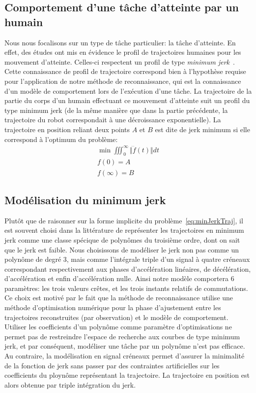 \subsection{Comportement d'une t\^ache d'atteinte par un humain}
Nous nous focalisons sur  un type de t\^ache particulier:
la t\^ache d'atteinte.
En effet, des études ont mis en évidence le profil  
de trajectoires humaines pour les mouvement d'atteinte.
Celles-ci respectent un profil de type \emph{minimum jerk}~\cite{flash85}.
\label{subsection:modelJerk}
Cette connaissance de profil de trajectoire correspond
bien à l'hypothèse requise pour l'application de notre méthode 
de reconnaissance, qui est la connaissance d'un modèle de comportement
lors de l'exécution d'une t\^ache.
La trajectoire de la partie du corps d'un humain 
effectuant ce mouvement d'atteinte suit un profil du type minimum jerk
(de la même manière que dans la partie précédente, la trajectoire du robot
correspondait à une décroissance exponentielle).
La trajectoire en position reliant deux points $A$ et $B$ est dite
de jerk minimum si elle correspond à l'optimum du problème:
\begin{eqnarray}
  \min \iiint_0^{\infty} \Vert \dddot{f}(t) \Vert dt \\
  f(0) = A\\
  f(\infty) = B
  \label{eq:minJerkTraj}
\end{eqnarray}

\subsection{Modélisation du minimum jerk}
Plutôt que de raisonner sur la forme implicite du problème~\eqref{eq:minJerkTraj},
il est souvent choisi dans la littérature de représenter les trajectoires 
en minimum jerk comme une classe spécique de polynômes du troisième ordre, 
dont on sait que le jerk est faible.
Nous choisissons de modéliser le jerk non pas comme un polynôme de degré 3,
mais comme l'intégrale triple d'un signal à quatre créneaux correspondant respectivement
aux phases d'accélération linéaires, de décélération, d'accélération et
enfin d'accélération nulle. Ainsi notre modèle comportera 6 paramètres:
les trois valeurs crêtes, et les trois instants relatifs de commutations.
Ce choix est motivé par le fait que la méthode de reconnaissance utilise
une méthode d'optimisation numérique pour la phase d'ajustement
entre les trajectoires reconstruites (par observation) et le modèle de comportement.
Utiliser les coefficients d'un polynôme comme paramètre 
d'optimisations ne permet pas de restreindre l'espace de recherche
aux courbes de type minimum jerk, et par conséquent,
modéliser une t\^ache par un polynôme n'est pas efficace.
Au contraire, la modélisation en signal créneaux
permet d'assurer la minimalité de la fonction de jerk
sans passer par des contraintes artificielles sur les 
coefficients du ploynôme représentant la trajectoire.
La trajectoire en position est
alors obtenue par triple intégration du jerk.


